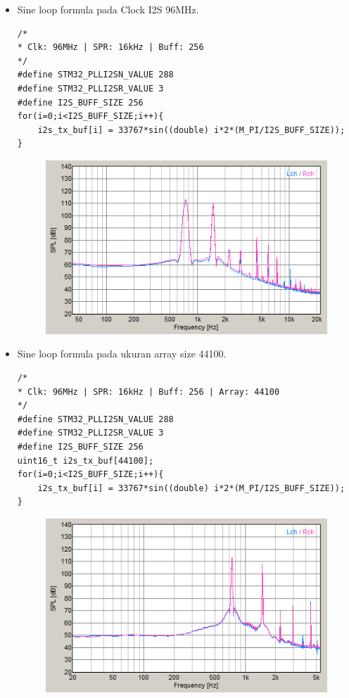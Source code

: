 \documentclass[12pt,]{article}
\begin{document}
\begin{itemize}
\begin{itemize}
			\newpage
			\item Sine loop formula pada Clock I2S 96MHz.
			\begin{verbatim}
/*
* Clk: 96MHz | SPR: 16kHz | Buff: 256
*/
#define STM32_PLLI2SN_VALUE 288
#define STM32_PLLI2SR_VALUE 3
#define I2S_BUFF_SIZE 256	
for(i=0;i<I2S_BUFF_SIZE;i++){
	i2s_tx_buf[i] = 33767*sin((double) i*2*(M_PI/I2S_BUFF_SIZE));
}
			\end{verbatim}
			\begin{figure}[H]
				\centering
				\includegraphics[width=0.5\linewidth]{result/sine_clk96}
			\end{figure}
		
			\item Sine loop formula pada ukuran array size 44100.
			\begin{verbatim}
/*
* Clk: 96MHz | SPR: 16kHz | Buff: 256 | Array: 44100
*/
#define STM32_PLLI2SN_VALUE 288
#define STM32_PLLI2SR_VALUE 3
#define I2S_BUFF_SIZE 256	
uint16_t i2s_tx_buf[44100];
for(i=0;i<I2S_BUFF_SIZE;i++){
	i2s_tx_buf[i] = 33767*sin((double) i*2*(M_PI/I2S_BUFF_SIZE));
}
			\end{verbatim}
			\begin{figure}[H]
				\centering
				\includegraphics[width=0.5\linewidth]{result/arr_spr_sine}
			\end{figure}
		

\end{itemize}
\end{itemize}
\end{document}
